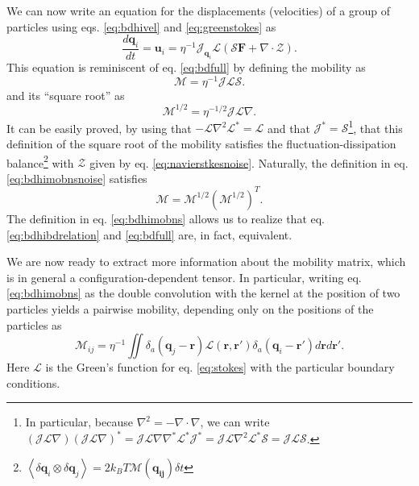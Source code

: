 \documentclass[ twoside,openright,titlepage,numbers=noenddot,%
headinclude,footinclude,cleardoublepage=empty,abstract=on,
BCOR=5mm,paper=a4,fontsize=11pt, dvipsnames
]{scrreprt}
\renewcommand{\vec}[1]{\bm{#1}}
\newcommand{\tens}[1]{\bm{\mathcal{#1}}}
\newcommand{\oper}[1]{\mathcal{#1}}
\newcommand{\dt}{\delta t}
\newcommand{\kT}{k_B T}
\newcommand{\ppos}{q}
\begin{document}
We can now write an equation for the displacements (velocities) of a group of particles using eqs. \eqref{eq:bdhivel} and \eqref{eq:greenstokes} as
\begin{equation}
  \label{eq:bdhibdrelation}
  \frac{d\vec{q}_i}{dt} = \vec{u}_i = \eta^{-1}\oper{J}_{\vec{\ppos}_i}\oper{L}(\oper{S}\vec{F} + \nabla\cdot\mathcal Z).
\end{equation}
This equation is reminiscent of eq. \eqref{eq:bdfull} by defining the mobility as
\begin{equation}
  \label{eq:bdhimobns}
  \tens{M} = \eta^{-1}\oper{J}\oper{L}\oper{S}.
\end{equation}
and its ``square root'' as
\begin{equation}
  \label{eq:bdhimobnsnoise}
  \tens{M}^{1/2} = \eta^{-1/2}\oper{J}\oper{L}\nabla.
\end{equation}
It can be easily proved, by using that $-\oper{L}\nabla^2\oper{L}^* = \oper{L}$ and that $\oper{J}^*=\oper{S}$\cite{Delong2014}\footnote{In particular, because $\nabla^2 = -\nabla\cdot\nabla$, we can write $\left(\oper{J}\oper{L}\nabla\right)\left(\oper{J}\oper{L}\nabla\right)^* = \oper{J}\oper{L}\nabla\nabla^*\oper{L}^*\oper{J}^* = \oper{J}\oper{L}\nabla^2\oper{L}^*\oper{S} = \oper{J}\oper{L}\oper{S}$.}, that this definition of the square root of the mobility satisfies the fluctuation-dissipation balance\footnote{$\left\langle\delta\vec{\ppos}_i\otimes\delta\vec{\ppos}_j\right\rangle = 2\kT\tens{M}(\vec{\ppos_{ij}})\dt$} with $\mathcal{Z}$ given by eq. \eqref{eq:navierstkesnoise}.
Naturally, the definition in eq. \eqref{eq:bdhimobnsnoise} satisfies
\begin{equation}
  \label{eq:mobsqrt}
  \tens{M} = \tens{M}^{1/2}\left(\tens{M}^{1/2}\right)^T.
\end{equation}
The definition in eq. \ref{eq:bdhimobns} allows us to realize that eq. \eqref{eq:bdhibdrelation} and \eqref{eq:bdfull} are, in fact, equivalent.

We are now ready to extract more information about the mobility matrix, which is in general a configuration-dependent tensor. In particular, writing eq. \eqref{eq:bdhimobns} as the double convolution with the kernel at the position of two particles yields a pairwise mobility, depending only on the positions of the particles as
\begin{equation}
  \label{eq:bdhimob}
  \tens{M}_{ij} = \eta^{-1}\iint{\delta_a(\vec{q}_j-\vec{r})\oper{L}(\vec{r}, \vec{r}')\delta_a(\vec{q}_i -\vec{r}')d\vec{r}d\vec{r}'}.
\end{equation}
Here $\oper{L}$ is the Green's function for eq. \eqref{eq:stokes} with the particular boundary conditions.
\end{document}
